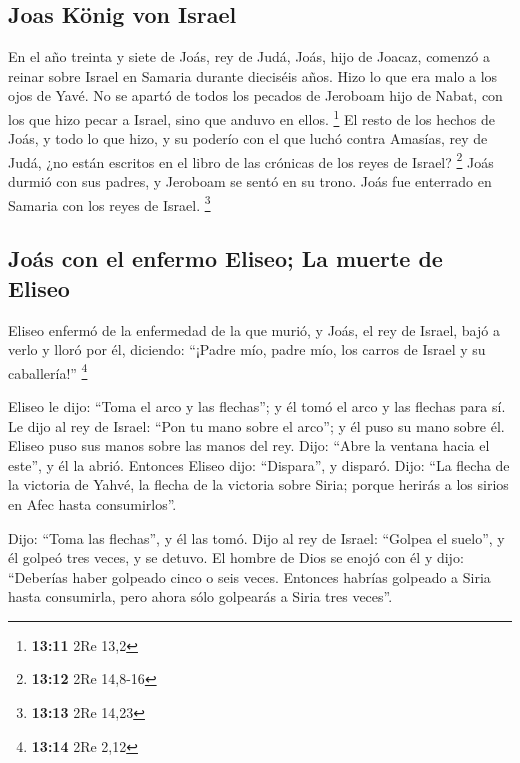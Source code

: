 \begin{paracol}{2}
\hypertarget{joas-kuxf6nig-von-israel}{%
\subsection{Joas König von Israel}\label{joas-kuxf6nig-von-israel}}

 En el año treinta y siete de Joás, rey de Judá, Joás,
hijo de Joacaz, comenzó a reinar sobre Israel en Samaria durante
dieciséis años.  Hizo lo que era malo a los ojos de Yavé.
No se apartó de todos los pecados de Jeroboam hijo de Nabat, con los que
hizo pecar a Israel, sino que anduvo en ellos. \footnote{\textbf{13:11}
  2Re 13,2}  El resto de los hechos de Joás, y todo lo
que hizo, y su poderío con el que luchó contra Amasías, rey de Judá, ¿no
están escritos en el libro de las crónicas de los reyes de Israel?
\footnote{\textbf{13:12} 2Re 14,8-16}  Joás durmió con
sus padres, y Jeroboam se sentó en su trono. Joás fue enterrado en
Samaria con los reyes de Israel. \footnote{\textbf{13:13} 2Re 14,23}

\hypertarget{jouxe1s-con-el-enfermo-eliseo-la-muerte-de-eliseo}{%
\subsection{Joás con el enfermo Eliseo; La muerte de
Eliseo}\label{jouxe1s-con-el-enfermo-eliseo-la-muerte-de-eliseo}}

 Eliseo enfermó de la enfermedad de la que murió, y Joás,
el rey de Israel, bajó a verlo y lloró por él, diciendo: ``¡Padre mío,
padre mío, los carros de Israel y su caballería!'' \footnote{\textbf{13:14}
  2Re 2,12}

 Eliseo le dijo: ``Toma el arco y las flechas''; y él
tomó el arco y las flechas para sí.  Le dijo al rey de
Israel: ``Pon tu mano sobre el arco''; y él puso su mano sobre él.
Eliseo puso sus manos sobre las manos del rey.  Dijo:
``Abre la ventana hacia el este'', y él la abrió. Entonces Eliseo dijo:
``Dispara'', y disparó. Dijo: ``La flecha de la victoria de Yahvé, la
flecha de la victoria sobre Siria; porque herirás a los sirios en Afec
hasta consumirlos''.

 Dijo: ``Toma las flechas'', y él las tomó. Dijo al rey
de Israel: ``Golpea el suelo'', y él golpeó tres veces, y se detuvo.
 El hombre de Dios se enojó con él y dijo: ``Deberías
haber golpeado cinco o seis veces. Entonces habrías golpeado a Siria
hasta consumirla, pero ahora sólo golpearás a Siria tres veces''.


\end{paracol}
